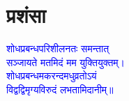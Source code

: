 \chapter[प्रशंसा]{प्रशंसा}
\fontsize{16}{24}\selectfont\centering\textcolor{blue}{शोधप्रबन्धपरिशीलनतः समन्तात्\\
सञ्जायते मतमिदं मम युक्तियुक्तम्।\\
शोधप्रबन्धमकरन्दमधुव्रतोऽयं\\
विद्वद्विमृग्यविरुदं लभतामिदानीम्॥}\\
\vspace{4mm}
\fontsize{14}{19}\selectfont
{}\\
